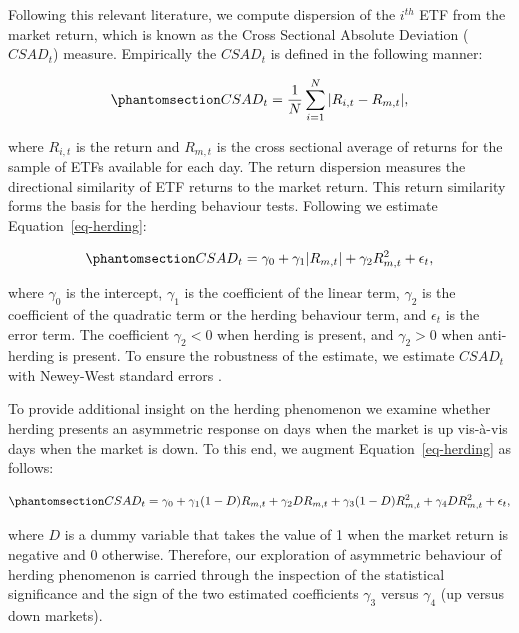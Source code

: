\documentclass[
  letterpaper,
  DIV=11,
  numbers=noendperiod]{scrartcl}
\begin{document}
Following this relevant literature, we compute dispersion of the
\(i^{th}\) ETF from the market return, which is known as the Cross
Sectional Absolute Deviation (\(CSAD_t\)) measure. Empirically the
\(CSAD_t\) is defined in the following manner:

\begin{equation}\phantomsection\label{eq-csad}{
CSAD_t = \dfrac{1}{N}\sum_{i=1}^{N} |R_{i,t} - R_{m,t}|,
}\end{equation}

where \(R_{i,t}\) is the return and \(R_{m,t}\) is the cross sectional
average of returns for the sample of ETFs available for each day. The
return dispersion measures the directional similarity of ETF returns to
the market return. This return similarity forms the basis for the
herding behaviour tests. Following \citet{galariotis2015} we estimate
Equation~\ref{eq-herding}:

\begin{equation}\phantomsection\label{eq-herding}{
CSAD_t = \gamma_0 + \gamma_1 |R_{m,t}| + \gamma_2 R_{m,t}^2 + \epsilon_t,
}\end{equation}

where \(\gamma_0\) is the intercept, \(\gamma_1\) is the coefficient of
the linear term, \(\gamma_2\) is the coefficient of the quadratic term
or the herding behaviour term, and \(\epsilon_t\) is the error term. The
coefficient \(\gamma_2 <0\) when herding is present, and \(\gamma_2 >0\)
when anti-herding is present. To ensure the robustness of the estimate,
we estimate \(CSAD_{t}\) with Newey-West standard errors
\citep[See][]{newey1987}.

To provide additional insight on the herding phenomenon we examine
whether herding presents an asymmetric response on days when the market
is up vis-à-vis days when the market is down. To this end, we augment
Equation~\ref{eq-herding} as follows:

\begin{equation}\phantomsection\label{eq-asymmetry}{
CSAD_t = \gamma_0 + \gamma_1(1-D) R_{m,t} + \gamma_2D R_{m,t} + \gamma_3(1-D) R_{m,t}^2  + \gamma_4D R_{m,t}^2 + \epsilon_t,
}\end{equation}

where \(D\) is a dummy variable that takes the value of 1 when the
market return is negative and 0 otherwise. Therefore, our exploration of
asymmetric behaviour of herding phenomenon is carried through the
inspection of the statistical significance and the sign of the two
estimated coefficients \(\gamma_3\) versus \(\gamma_4\) (up versus down
markets).
\end{document}
